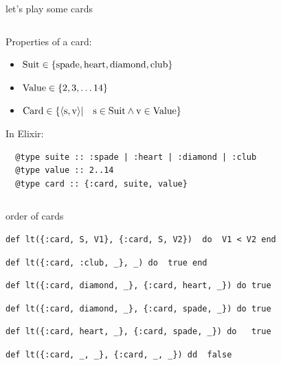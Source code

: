 \begin{frame}[fragile]{let's play some cards}
\begin{columns}
 \begin{column}{0.8\linewidth}
  Properties of a card:
  \begin{itemize}
   \item ${\rm Suit} \in \{{\rm spade}, {\rm heart}, {\rm diamond}, {\rm club}\}$
   \pause
   \item ${\rm Value} \in \{2,3,\ldots 14\}$
   \pause 
   \item ${\rm Card} \in  \{\langle {\rm s}, {\rm v} \rangle | \quad {\rm s} \in {\rm Suit} \wedge {\rm v} \in {\rm Value} \}$
  \end{itemize}

  \vspace{10pt}  \pause
  In Elixir:
  \begin{verbatim}
  @type suite :: :spade | :heart | :diamond | :club
  @type value :: 2..14
  @type card :: {:card, suite, value}
  \end{verbatim}

 \end{column}
\end{columns}

\end{frame}

\begin{frame}[fragile]{order of cards}

\pause
\begin{verbatim}
def lt({:card, S, V1}, {:card, S, V2})  do  V1 < V2 end
\end{verbatim}
\pause
\begin{verbatim}
def lt({:card, :club, _}, _) do  true end
\end{verbatim}
\pause
\begin{verbatim}
def lt({:card, diamond, _}, {:card, heart, _}) do true
\end{verbatim}
\pause
\begin{verbatim}
def lt({:card, diamond, _}, {:card, spade, _}) do true
\end{verbatim}
\pause
\begin{verbatim}
def lt({:card, heart, _}, {:card, spade, _}) do   true
\end{verbatim}
\pause
\begin{verbatim}
def lt({:card, _, _}, {:card, _, _}) dd  false
\end{verbatim}

\end{frame}

